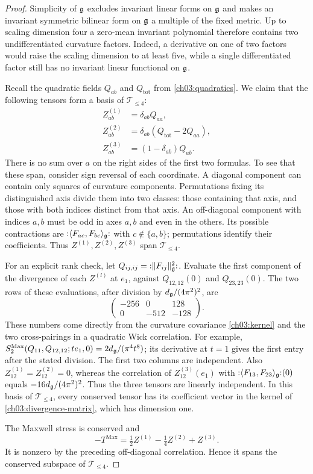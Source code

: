 \begin{proof}
Simplicity of $\mathfrak g$ excludes invariant linear forms on $\mathfrak g$ and makes
an invariant symmetric bilinear form on $\mathfrak g$ a multiple of the fixed
metric. Up to scaling dimension four a zero-mean invariant polynomial therefore
contains two undifferentiated curvature factors. Indeed, a derivative on
one of two factors would raise the scaling dimension to at least five, while a
single differentiated factor still has no invariant linear functional on $\mathfrak g$.

Recall the quadratic fields $Q_{ab}$ and $Q_{\mathrm{tot}}$ from
\eqref{ch03:quadratics}. We claim that the following tensors form a basis of $\mathscr T_{\le 4}$:
\begin{align*}
 Z^{(1)}_{ab}&=\delta_{ab}Q_{aa},\\
 Z^{(2)}_{ab}&=\delta_{ab}(Q_{\mathrm{tot}}-2Q_{aa}),\\
 Z^{(3)}_{ab}&=(1-\delta_{ab})Q_{ab}.
\end{align*}
There is no sum over $a$ on the right sides of the first two formulas.
To see that these span, consider sign reversal of each coordinate.
A diagonal component can contain only squares of curvature components.
Permutations fixing its distinguished axis divide them into two classes:
those containing that axis, and those with both indices distinct from that axis.
An off-diagonal component with indices $a,b$ must be odd in axes $a,b$
and even in the others. Its possible contractions are
${:}\langle F_{ac},F_{bc}\rangle_{\mathfrak g}{:}$ with $c\notin\{a,b\}$;
permutations identify their coefficients. Thus $Z^{(1)},Z^{(2)},Z^{(3)}$ span $\mathscr T_{\le 4}$.

For an explicit rank check, let
$Q_{ij,ij}={:}\|F_{ij}\|_{\mathfrak g}^2{:}$.
Evaluate the first component of the divergence of each $Z^{(l)}$ at
$e_1$, against $Q_{12,12}(0)$ and $Q_{23,23}(0)$. The two rows of
these evaluations, after division by $d_{\mathfrak g}/(4\pi^2)^2$, are
\begin{equation}\label{ch03:divergence-matrix}
 \begin{pmatrix}-256&0&128\\0&-512&-128\end{pmatrix}.
\end{equation}
These numbers come directly from the curvature covariance
\eqref{ch03:kernel} and the two cross-pairings in a quadratic Wick
correlation. For example,
$S_2^{\mathrm{Max}}(Q_{11},Q_{12,12};te_1,0)
=2d_{\mathfrak g}/(\pi^4t^8)$; its derivative at $t=1$ gives the first
entry after the stated division. The first two columns are independent.
Also $Z^{(1)}_{12}=Z^{(2)}_{12}=0$, whereas the correlation of
$Z^{(3)}_{12}(e_1)$ with
${:}\langle F_{13},F_{23}\rangle_{\mathfrak g}{:}(0)$ equals
$-16d_{\mathfrak g}/(4\pi^2)^2$. Thus the three tensors are linearly independent. In this basis of
$\mathscr T_{\le 4}$, every conserved tensor has its coefficient vector
in the kernel of \eqref{ch03:divergence-matrix}, which has dimension one.

The Maxwell stress is conserved and
\[
 -T^{\mathrm{Max}}
 =\tfrac12 Z^{(1)}-\tfrac14 Z^{(2)}+Z^{(3)}.
\]
It is nonzero by the preceding off-diagonal correlation. Hence it spans the conserved subspace of $\mathscr T_{\le 4}$.
\end{proof}

